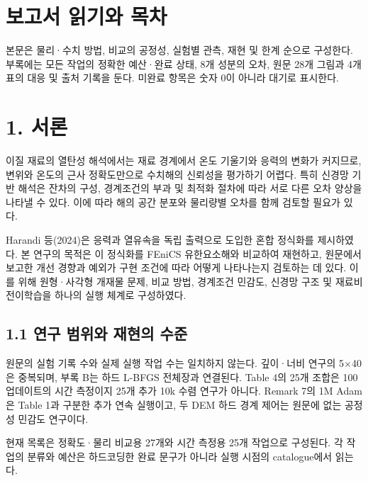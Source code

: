 \documentclass[10pt,a4paper]{article}
\begin{document}
\clearpage

\section*{보고서 읽기와 목차}

본문은 물리·수치 방법, 비교의 공정성, 실험별 관측, 재현 및 한계 순으로 구성한다. 부록에는 모든 작업의 정확한 예산·완료 상태, 8개 성분의 오차, 원문 28개 그림과 4개 표의 대응 및 출처 기록을 둔다. 미완료 항목은 숫자 0이 아니라 대기로 표시한다.\par

\tableofcontents\thispagestyle{fancy}

\clearpage

\section{1. 서론}

이질 재료의 열탄성 해석에서는 재료 경계에서 온도 기울기와 응력의 변화가 커지므로, 변위와 온도의 근사 정확도만으로 수치해의 신뢰성을 평가하기 어렵다. 특히 신경망 기반 해석은 잔차의 구성, 경계조건의 부과 및 최적화 절차에 따라 서로 다른 오차 양상을 나타낼 수 있다. 이에 따라 해의 공간 분포와 물리량별 오차를 함께 검토할 필요가 있다.\par

Harandi 등(2024)은 응력과 열유속을 독립 출력으로 도입한 혼합 정식화를 제시하였다. 본 연구의 목적은 이 정식화를 FEniCS 유한요소해와 비교하여 재현하고, 원문에서 보고한 개선 경향과 예외가 구현 조건에 따라 어떻게 나타나는지 검토하는 데 있다. 이를 위해 원형·사각형 개재물 문제, 비교 방법, 경계조건 민감도, 신경망 구조 및 재료비 전이학습을 하나의 실행 체계로 구성하였다.\par

\subsection{1.1 연구 범위와 재현의 수준}

원문의 실험 기록 수와 실제 실행 작업 수는 일치하지 않는다. 깊이·너비 연구의 5$\times$40은 중복되며, 부록 B는 하드 L-BFGS 전체장과 연결된다. Table 4의 25개 조합은 100 업데이트의 시간 측정이지 25개 추가 10k 수렴 연구가 아니다. Remark 7의 1M Adam은 Table 1과 구분한 추가 연속 실행이고, 두 DEM 하드 경계 제어는 원문에 없는 공정성 민감도 연구이다.\par

현재 목록은 정확도·물리 비교용 27개와 시간 측정용 25개 작업으로 구성된다. 각 작업의 분류와 예산은 하드코딩한 완료 문구가 아니라 실행 시점의 catalogue에서 읽는다.\par
\end{document}
